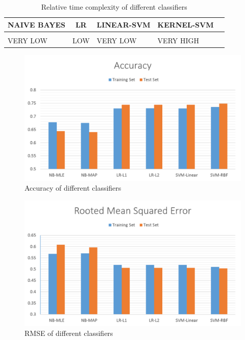 \documentclass{article} %
\begin{document}
\begin{table}[H]
\caption{Relative time complexity of different classifiers}
\begin{center}
\begin{tabular}{lllll}
\multicolumn{1}{c}{\bf NAIVE BAYES}  &\multicolumn{1}{c}{\bf LR} &\multicolumn{1}{c}{\bf LINEAR-SVM} &\multicolumn{1}{c}{\bf KERNEL-SVM}
\\ \hline \\

VERY LOW  &LOW &VERY LOW &VERY HIGH\\

\end{tabular}
\end{center}
\end{table}

\begin{figure}[H]
\begin{center}
\includegraphics[scale=0.4]{Accuracy.png}
\end{center}
\caption{Accuracy of different classifiers}
\end{figure}


\begin{figure}[H]
\begin{center}
\includegraphics[scale=0.4]{RMSE.png}
\end{center}
\caption{RMSE of different classifiers}
\end{figure}
\end{document}
